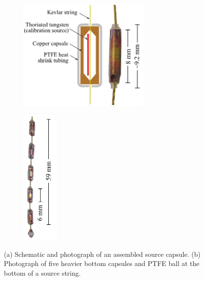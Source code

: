 \begin{figure}[htpb]
\begin{center}
\begin{subfigure}[b]{0.60\textwidth}
\includegraphics[height=2.2in]{Figures/source_capsule_schematic.pdf}
\caption{}
\label{fig:source_carrierA}
\end{subfigure}
\begin{subfigure}[b]{0.15\textwidth}
\includegraphics[height=2.7in]{Figures/string_bottom.pdf}
\caption{}
\label{fig:source_carrierB}
\end{subfigure}
\end{center}
\caption[(a) Schematic and photograph of an assembled source capsule. (b) Photograph of five heavier bottom capsules and PTFE ball at the bottom of a source string]{(a) Schematic and photograph of an assembled source capsule. (b) Photograph of five heavier bottom capsules and PTFE ball at the bottom of a source string.}
\label{fig:source_carrier}
\end{figure}
 
